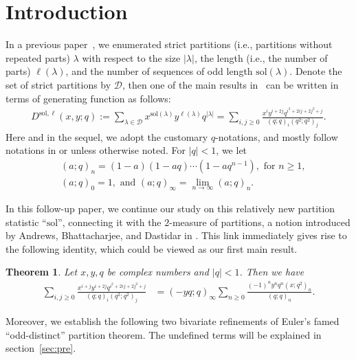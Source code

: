 \documentclass[11pt,reqno]{amsart}
\numberwithin{equation}{section}
\theoremstyle{plain}
\newtheorem{theorem}{Theorem}[section]
\theoremstyle{definition}
\theoremstyle{named}
\newcommand{\abs}[1]{\left|#1\right|}
\def\cD{\mathcal{D}}
\def\la{\lambda}
\def\sol{\mathrm{sol}}
\begin{document}
\section{Introduction}\label{sec:intro}
In a previous paper~\cite{FL24}, we enumerated strict partitions (i.e., partitions without repeated parts) $\la$ with respect to the size $\abs{\la}$, the length (i.e., the number of parts) $\ell(\la)$, and the number of sequences of odd length $\sol(\la)$. Denote the set of strict partitions by $\cD$, then one of the main results in~\cite{FL24} can be written in terms of generating function as follows:
\begin{align}\label{gf:l-sol}
D^{\sol,\ell}(x,y;q):=\sum_{\la\in\cD}x^{\sol(\la)}y^{\ell(\la)}q^{\abs{\la}}=\sum_{i,j\ge 0}\frac{x^iy^{i+2j}q^{i^2+2ij+2j^2+j}}{(q;q)_i(q^2;q^2)_j}.
\end{align}
Here and in the sequel, we adopt the customary $q$-notations, and mostly follow notations in \cite{FL24} or \cite{andtp} unless otherwise noted. For $\abs{q}<1$, we let
\begin{align*}
& (a;q)_n=(1-a)(1-aq)\cdots(1-aq^{n-1}), \text{ for $n\ge 1$,}\\
& (a;q)_0=1,\text{ and } (a;q)_{\infty}=\lim_{n\to\infty}(a;q)_n.
\end{align*}

In this follow-up paper, we continue our study on this relatively new partition statistic ``$\sol$'', connecting it with the $2$-measure of partitions, a notion introduced by Andrews, Bhattacharjee, and Dastidar in \cite{ABD22}. This link immediately gives rise to the following identity, which could be viewed as our first main result.

\begin{theorem}\label{thm:double sum vs Andrews}
Let $x,y,q$ be complex numbers and $\abs{q}<1$. Then we have
\begin{align}\label{id:double sum vs Andrews}
\sum_{i,j\ge 0}\frac{x^{i+j}y^{i+2j}q^{i^2+2ij+2j^2+j}}{(q;q)_i(q^2;q^2)_j} &= (-yq;q)_{\infty}\sum_{n\ge 0}\frac{(-1)^ny^nq^n(x;q^2)_n}{(q;q)_n}.
\end{align}
\end{theorem}

Moreover, we establish the following two bivariate refinements of Euler's famed ``odd-distinct'' partition theorem. The undefined terms will be explained in section~\ref{sec:pre}.
\end{document}
